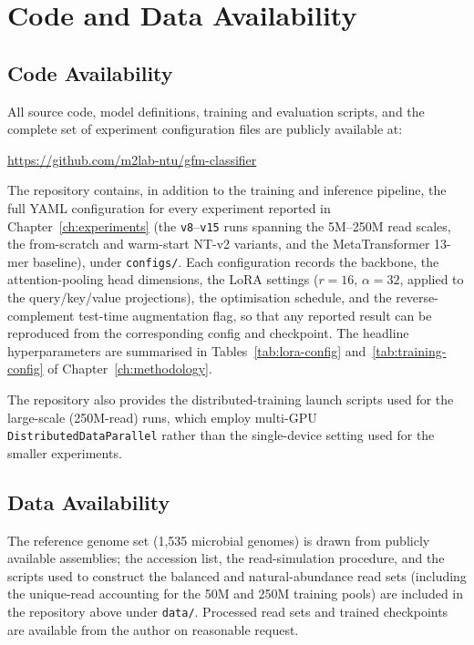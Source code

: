 
\chapter{Code and Data Availability}
\label{app:availability}

\section{Code Availability}
\label{sec:code-availability}

All source code, model definitions, training and evaluation scripts, and the complete set of experiment configuration files are publicly available at:

\begin{center}
\url{https://github.com/m2lab-ntu/gfm-classifier}
\end{center}

The repository contains, in addition to the training and inference pipeline, the full YAML configuration for every experiment reported in Chapter~\ref{ch:experiments} (the \texttt{v8}--\texttt{v15} runs spanning the 5M--250M read scales, the from-scratch and warm-start NT-v2 variants, and the MetaTransformer 13-mer baseline), under \texttt{configs/}. Each configuration records the backbone, the attention-pooling head dimensions, the LoRA settings ($r{=}16$, $\alpha{=}32$, applied to the query/key/value projections), the optimisation schedule, and the reverse-complement test-time augmentation flag, so that any reported result can be reproduced from the corresponding config and checkpoint. The headline hyperparameters are summarised in Tables~\ref{tab:lora-config} and~\ref{tab:training-config} of Chapter~\ref{ch:methodology}.

The repository also provides the distributed-training launch scripts used for the large-scale (250M-read) runs, which employ multi-GPU \texttt{DistributedDataParallel} rather than the single-device setting used for the smaller experiments.

\section{Data Availability}
\label{sec:data-availability}

The reference genome set (1{,}535 microbial genomes) is drawn from publicly available assemblies; the accession list, the read-simulation procedure, and the scripts used to construct the balanced and natural-abundance read sets (including the unique-read accounting for the 50M and 250M training pools) are included in the repository above under \texttt{data/}. Processed read sets and trained checkpoints are available from the author on reasonable request.

